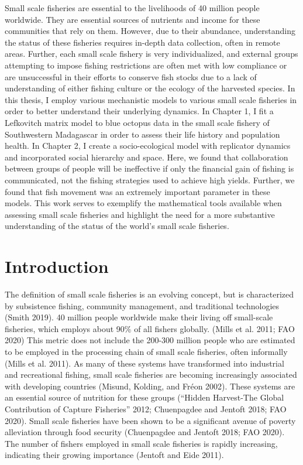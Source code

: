 \documentclass[
]{article}
\begin{document}
Small scale fisheries are essential to the livelihoods of 40 million people worldwide. They are essential sources of nutrients and income for these communities that rely on them. However, due to their abundance, understanding the status of these fisheries requires in-depth data collection, often in remote areas. Further, each small scale fishery is very individualized, and external groups attempting to impose fishing restrictions are often met with low compliance or are unsuccessful in their efforts to conserve fish stocks due to a lack of understanding of either fishing culture or the ecology of the harvested species. In this thesis, I employ various mechanistic models to various small scale fisheries in order to better understand their underlying dynamics. In Chapter 1, I fit a Lefkovitch matrix model to blue octopus data in the small scale fishery of Southwestern Madagascar in order to assess their life history and population health. In Chapter 2, I create a socio-ecological model with replicator dynamics and incorporated social hierarchy and space. Here, we found that collaboration between groups of people will be ineffective if only the financial gain of fishing is communicated, not the fishing strategies used to achieve high yields. Further, we found that fish movement was an extremely important parameter in these models. This work serves to exemplify the mathematical tools available when assessing small scale fisheries and highlight the need for a more substantive understanding of the status of the world's small scale fisheries.

\newpage


\hypertarget{introduction}{%
\section{Introduction}\label{introduction}}

The definition of small scale fisheries is an evolving concept, but is characterized by subsistence fishing, community management, and traditional technologies (Smith 2019). 40 million people worldwide make their living off small-scale fisheries, which employs about 90\% of all fishers globally. (Mills et al. 2011; FAO 2020) This metric does not include the 200-300 million people who are estimated to be employed in the processing chain of small scale fisheries, often informally (Mills et al. 2011). As many of these systems have transformed into industrial and recreational fishing, small scale fisheries are becoming increasingly associated with developing countries (Misund, Kolding, and Fréon 2002). These systems are an essential source of nutrition for these groups ({``Hidden {Harvest}-{The} {Global} {Contribution} of {Capture} {Fisheries}''} 2012; Chuenpagdee and Jentoft 2018; FAO 2020). Small scale fisheries have been shown to be a significant avenue of poverty alleviation through food security (Chuenpagdee and Jentoft 2018; FAO 2020). The number of fishers employed in small scale fisheries is rapidly increasing, indicating their growing importance (Jentoft and Eide 2011).
\end{document}
